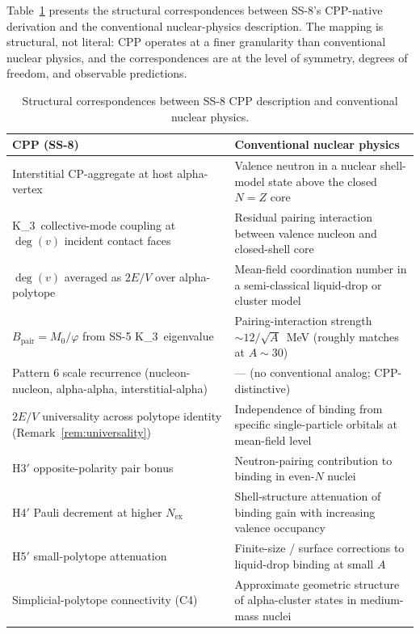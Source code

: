 \documentclass[11pt,letterpaper]{article}
\theoremstyle{definition}
\newcommand{\Mzero}{M_0}
\newcommand{\phig}{\varphi}
\newcommand{\Bpair}{B_{\text{pair}}}
\newcommand{\Nex}{N_{\text{ex}}}
\newcommand{\Kthree}{K_3}
\newcommand{\degv}{\deg(v)}
\begin{document}
Table~\ref{tab:mapping} presents the structural correspondences between SS-8's CPP-native derivation and the conventional nuclear-physics description. The mapping is structural, not literal: CPP operates at a finer granularity than conventional nuclear physics, and the correspondences are at the level of symmetry, degrees of freedom, and observable predictions.

\begin{table}[h]
\centering
\caption{Structural correspondences between SS-8 CPP description and conventional nuclear physics.}
\label{tab:mapping}
\renewcommand{\arraystretch}{1.4}
\begin{tabular}{@{}p{5.5cm}p{7.5cm}@{}}
\toprule
\textbf{CPP (SS-8)} & \textbf{Conventional nuclear physics} \\
\midrule
Interstitial CP-aggregate at host alpha-vertex & Valence neutron in a nuclear shell-model state above the closed $N = Z$ core \\
\Kthree\ collective-mode coupling at $\degv$ incident contact faces & Residual pairing interaction between valence nucleon and closed-shell core \\
$\degv$ averaged as $2E/V$ over alpha-polytope & Mean-field coordination number in a semi-classical liquid-drop or cluster model \\
$\Bpair = \Mzero/\phig$ from SS-5 \Kthree\ eigenvalue & Pairing-interaction strength $\sim 12/\sqrt{A}$~MeV (roughly matches at $A \sim 30$) \\
Pattern 6 scale recurrence (nucleon-nucleon, alpha-alpha, interstitial-alpha) & --- (no conventional analog; CPP-distinctive) \\
$2E/V$ universality across polytope identity (Remark~\ref{rem:universality}) & Independence of binding from specific single-particle orbitals at mean-field level \\
H3$'$ opposite-polarity pair bonus & Neutron-pairing contribution to binding in even-$N$ nuclei \\
H4$'$ Pauli decrement at higher $\Nex$ & Shell-structure attenuation of binding gain with increasing valence occupancy \\
H5$'$ small-polytope attenuation & Finite-size / surface corrections to liquid-drop binding at small $A$ \\
Simplicial-polytope connectivity (C4) & Approximate geometric structure of alpha-cluster states in medium-mass nuclei \\
\bottomrule
\end{tabular}
\end{table}
\end{document}
